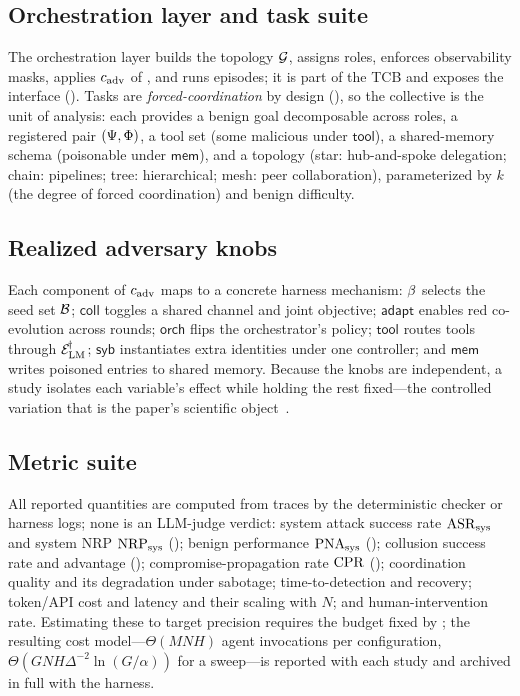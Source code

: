 \subsection{Orchestration layer and task suite}
The orchestration layer builds the topology $\mathcal{G}$, assigns roles, enforces observability
masks, applies $c_{\mathrm{adv}}$ of , and runs episodes; it is
part of the TCB and exposes the \corb{} interface (). Tasks are
\emph{forced-coordination} by design (), so the collective is the unit of
analysis: each provides a benign goal decomposable across roles, a registered pair
$(\Psi,\Phi)$, a tool set (some malicious under $\mathsf{tool}$), a shared-memory
schema (poisonable under $\mathsf{mem}$), and a topology (star: hub-and-spoke delegation;
chain: pipelines; tree: hierarchical; mesh: peer collaboration), parameterized by $k$ (the
degree of forced coordination) and benign difficulty.

\subsection{Realized adversary knobs}
Each component of $c_{\mathrm{adv}}$ maps to a concrete harness mechanism:
$\beta$ selects the seed set $\mathcal{B}$; $\mathsf{coll}$ toggles a shared channel and
joint objective; $\mathsf{adapt}$ enables red co-evolution across \corb{} rounds;
$\mathsf{orch}$ flips the orchestrator's policy; $\mathsf{tool}$ routes tools through
$\mathcal{E}_{\mathrm{LM}}^{\!\dagger}$; $\mathsf{syb}$ instantiates extra identities under one controller; and
$\mathsf{mem}$ writes poisoned entries to shared memory. Because the knobs are independent,
a study isolates each variable's effect while holding the rest fixed---the controlled
variation that is the paper's scientific object~\cite{rubin1974estimating}.

\subsection{Metric suite}
\label{sec:metric-suite}
All reported quantities are computed from traces by the deterministic checker or harness
logs; none is an LLM-judge verdict: system attack success rate $\mathrm{ASR}_{\mathrm{sys}}$ and system NRP
$\mathrm{NRP}_{\mathrm{sys}}$ (); benign performance $\mathrm{PNA}_{\mathrm{sys}}$ ();
collusion success rate and advantage (); compromise-propagation rate $\mathrm{CPR}$
(); coordination quality and its degradation under sabotage; time-to-detection
and recovery; token/API cost and latency and their scaling with $N$; and human-intervention
rate. Estimating these to target precision requires the budget fixed by ;
the resulting cost model---$\Theta(MNH)$ agent invocations per configuration,
$\Theta(GNH\Delta^{-2}\ln(G/\alpha))$ for a sweep---is reported with each study and
archived in full with the harness.